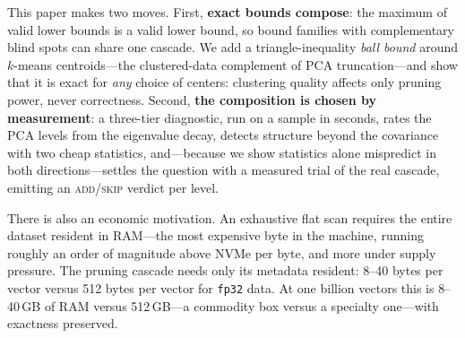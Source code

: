 \documentclass[sigconf,nonacm]{acmart}
\begin{document}
This paper makes two moves. First, \textbf{exact bounds compose}: the
maximum of valid lower bounds is a valid lower bound, so bound families with
complementary blind spots can share one cascade. We add a
triangle-inequality \emph{ball bound} around $k$-means centroids---the
clustered-data complement of PCA truncation---and show that it is exact for
\emph{any} choice of centers: clustering quality affects only pruning power,
never correctness. Second, \textbf{the composition is chosen by
measurement}: a three-tier diagnostic, run on a sample in seconds, rates the
PCA levels from the eigenvalue decay, detects structure beyond the
covariance with two cheap statistics, and---because we show statistics alone
mispredict in both directions---settles the question with a measured trial
of the real cascade, emitting an \textsc{add}/\textsc{skip} verdict per
level.

There is also an economic motivation. An exhaustive flat scan requires the
entire dataset resident in RAM---the most expensive byte in the machine,
running roughly an order of magnitude above NVMe per byte, and more under
supply pressure. The pruning cascade needs only its metadata resident: 8--40
bytes per vector versus 512 bytes per vector for \texttt{fp32} data. At one
billion vectors this is 8--40\,GB of RAM versus 512\,GB---a commodity box
versus a specialty one---with exactness preserved.
\end{document}

